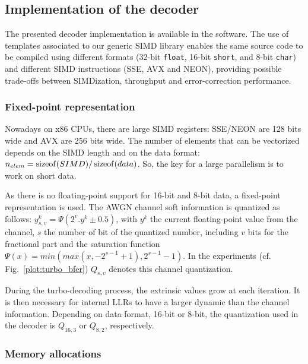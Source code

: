 \subsection{Implementation of the decoder}
\label{sec:turbo_implem}

The presented decoder implementation is available in the \AFFECT software. The
use of \Cxx templates associated to our generic SIMD library enables the
same source code to be compiled using different formats (32-bit \verb|float|,
16-bit \verb|short|, and 8-bit \verb|char|) and different SIMD instructions
(SSE, AVX and NEON), providing possible trade-offs between SIMDization,
throughput and error-correction performance.

\subsubsection{Fixed-point representation}

Nowadays on x86 CPUs, there are large SIMD registers: SSE/NEON are 128 bits
wide and AVX are 256 bits wide. The number of elements that can be vectorized
depends on the SIMD length and on the data format:
$n_{elem} = \operatorname*{sizeof}(SIMD) / \operatorname*{sizeof}(data)$. So, the key for a large parallelism
is to work on short data.

As there is no floating-point support for 16-bit and 8-bit data, a fixed-point
representation is used. The AWGN channel soft information is quantized as
follows: $y_{s,v}^k = \Psi(2^v . y^k \pm 0.5)$, with $y^k$ the current
floating-point value from the channel, $s$ the number of bit of the quantized
number, including $v$ bits for the fractional part and the saturation function
$\Psi(x) = min(max(x, -2^{s-1} +1), 2^{s-1} -1)$. In the experiments
(cf. Fig.~\ref{plot:turbo_bfer}) $Q_{s,v}$ denotes this channel quantization.

During the turbo-decoding process, the extrinsic values grow at each iteration.
It is then necessary for internal LLRs to have a larger dynamic than the channel
information. Depending on data format, 16-bit or 8-bit, the quantization used in
the decoder is $Q_{16,3}$ or $Q_{8,2}$, respectively.

\subsubsection{Memory allocations}

